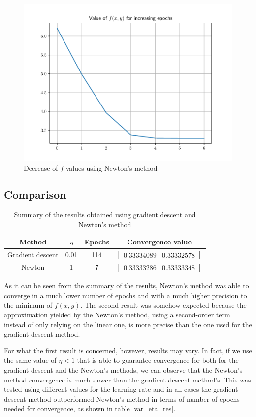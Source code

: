 \documentclass[letterpaper,headings=standardclasses]{scrartcl}
\begin{document}
\begin{figure}[H]
\centering
\includegraphics[width=.7\linewidth]{nm_fval.pdf}
\caption{Decrease of $f$-values using Newton's method}
\label{nm_fval}
\end{figure}

\subsection{Comparison}

\begin{table}[h]
\centering
\begin{tabular}{|c|c|c|c|}
\hline
Method           & $\eta$ & Epochs & Convergence value \\ \hline
Gradient descent & 0.01   & 114    & $[\begin{matrix} 0.33334089 & 0.33332578 \end{matrix}]$ \\ \hline
Newton           & 1      & 7      & $[\begin{matrix} 0.33333286 & 0.33333348 \end{matrix}]$ \\ \hline
\end{tabular}
\caption{Summary of the results obtained using gradient descent and Newton's method}
\label{summ_res}
\end{table}

As it can be seen from the summary of the results, Newton's method was able to converge in a much lower number of epochs and with a much higher precision to the minimum of $f(x,y)$. The second result was somehow expected because the approximation yielded by the Newton's method, using a second-order term instead of only relying on the linear one, is more precise than the one used for the gradient descent method.

For what the first result is concerned, however, results may vary. In fact, if we use the same value of $\eta < 1$ that is able to guarantee convergence for both for the gradient descent and the Newton's methods, we can observe that the Newton's method convergence is much slower than the gradient descent method's. This was tested using different values for the learning rate and in all cases the gradient descent method outperformed Newton's method in terms of number of epochs needed for convergence, as shown in table \ref{var_eta_res}.
\end{document}
